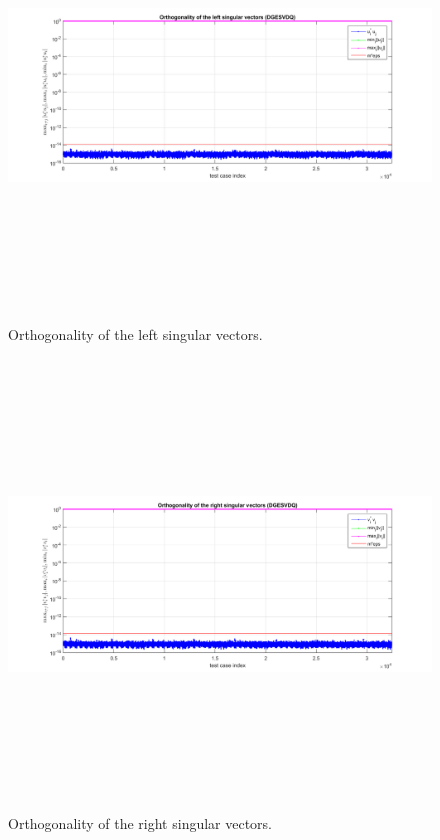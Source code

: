\documentclass[12pt, a4paper, final]{article}
\numberwithin{equation}{section}
\begin{document}
\begin{figure}[h]
	\begin{center}
		\includegraphics[width=6.3in,height=4.7in]{Fig6.png}
	\end{center}	
	\caption{ \label{fig:6} Orthogonality of the left singular vectors.}
\end{figure}

\begin{figure}[h]
	\begin{center}
		\includegraphics[width=6.3in,height=4.7in]{Fig7.png}
	\end{center}	
	\caption{ \label{fig:7} Orthogonality of the right singular vectors.}
\end{figure} 
\end{document}
